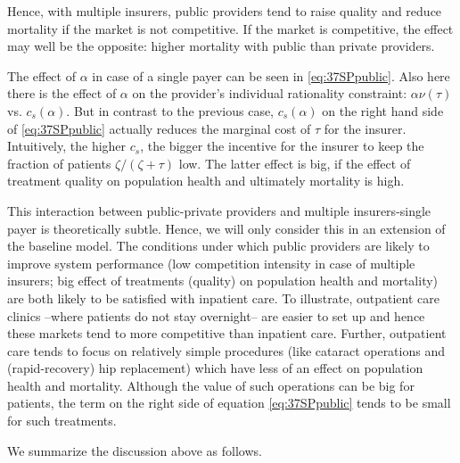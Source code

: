 \documentclass[12pt,english,a4paper]{article}
\begin{document}
Hence, with multiple insurers, public providers tend to raise quality and reduce mortality if the market is not competitive. If the market is competitive, the effect may well be the opposite: higher mortality with public than private providers.

The effect of \(\alpha\) in case of a single payer can be seen in \eqref{eq:37SPpublic}. Also here there is the effect of \(\alpha\) on the provider's individual rationality constraint: \(\alpha \nu(\tau)\) vs. \(c_s(\alpha)\). But in contrast to the previous case, \(c_s(\alpha)\) on the right hand side of \eqref{eq:37SPpublic} actually reduces the marginal cost of \(\tau\) for the insurer. Intuitively, the higher \(c_s\), the bigger the incentive for the insurer to keep the fraction of patients \(\zeta/(\zeta+\tau)\) low. The latter effect is big, if the effect of treatment quality on population health and ultimately mortality is high.

This interaction between public-private providers and multiple insurers-single payer is theoretically subtle. Hence, we will only consider this in an extension of the baseline model. The conditions under which public providers are likely to improve system performance (low competition intensity in case of multiple insurers; big effect of treatments (quality) on population health and mortality) are both likely to be satisfied with inpatient care. To illustrate, outpatient care clinics --where patients do not stay overnight-- are easier to set up and hence these markets tend to more competitive than inpatient care. Further, outpatient care tends to focus on relatively simple procedures (like cataract operations and (rapid-recovery) hip replacement) which have less of an effect on population health and mortality. Although the value of such operations can be big for patients, the term on the right side of equation \eqref{eq:37SPpublic} tends to be small for such treatments.

We summarize the discussion above as follows.
\end{document}
